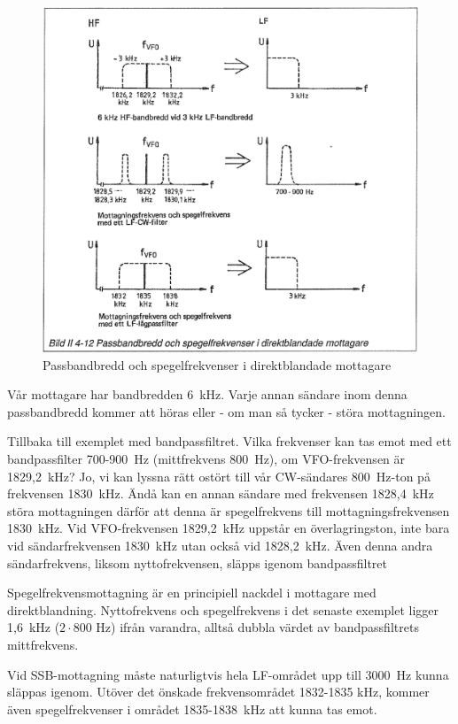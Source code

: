 \begin{figure}
  \includegraphics[width=\textwidth]{images/bild_2_4-12}
  \caption{Passbandbredd och spegelfrekvenser i direktblandade mottagare}
  \label{fig:bildII4-12}
\end{figure}

Vår mottagare har bandbredden 6~kHz.  Varje annan sändare inom denna
passbandbredd kommer att höras eller - om man så tycker - störa
mottagningen.

Tillbaka till exemplet med bandpassfiltret. Vilka frekvenser kan tas
emot med ett bandpassfilter 700-900~Hz (mittfrekvens 800~Hz), om
VFO-frekvensen är 1829,2~kHz?  Jo, vi kan lyssna rätt ostört till vår
CW-sändares 800~Hz-ton på frekvensen 1830~kHz. Ändå kan en annan
sändare med frekvensen 1828,4~kHz störa mottagningen därför att denna
är spegelfrekvens till mottagningsfrekvensen 1830~kHz. Vid
VFO-frekvensen 1829,2~kHz uppstår en överlagringston, inte bara vid
sändarfrekvensen 1830~kHz utan också vid 1828,2~kHz. Även denna andra
sändarfrekvens, liksom nyttofrekvensen, släpps igenom bandpassfiltret

Spegelfrekvensmottagning är en principiell nackdel i mottagare med
direktblandning. Nyttofrekvens och spegelfrekvens i det senaste
exemplet ligger 1,6~kHz (\(2 \cdot 800\) Hz) ifrån varandra, alltså
dubbla värdet av bandpassfiltrets mittfrekvens.

Vid SSB-mottagning måste naturligtvis hela LF-området upp till 3000~Hz
kunna släppas igenom. Utöver det önskade frekvensområdet 1832-1835
kHz, kommer även spegelfrekvenser i området 1835-1838~kHz att kunna
tas emot.

